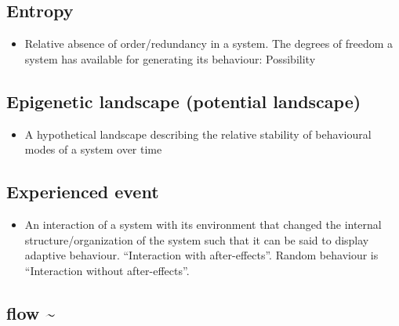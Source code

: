\documentclass[12pt,]{book}
\providecommand{\tightlist}{%
  \setlength{\itemsep}{0pt}\setlength{\parskip}{0pt}}
\begin{document}
\hypertarget{Entr27}{%
\subsection*{\texorpdfstring{\textbf{Entropy}}{Entropy}}\label{Entr27}}

\begin{itemize}
\tightlist
\item
  Relative absence of order/redundancy in a system. The degrees of freedom a system has available for generating its behaviour: Possibility
\end{itemize}

\hypertarget{Epig28}{%
\subsection*{\texorpdfstring{\textbf{Epigenetic landscape (potential landscape)}}{Epigenetic landscape (potential landscape)}}\label{Epig28}}

\begin{itemize}
\tightlist
\item
  A hypothetical landscape describing the relative stability of behavioural modes of a system over time
\end{itemize}

\hypertarget{Expe29}{%
\subsection*{\texorpdfstring{\textbf{Experienced event}}{Experienced event}}\label{Expe29}}

\begin{itemize}
\tightlist
\item
  An interaction of a system with its environment that changed the internal structure/organization of the system such that it can be said to display adaptive behaviour. ``Interaction with after-effects''. Random behaviour is ``Interaction without after-effects''.
\end{itemize}

\hypertarget{flow30}{%
\subsection*{\texorpdfstring{\textbf{flow \textasciitilde{}}}{flow \textasciitilde{}}}\label{flow30}}
\end{document}
